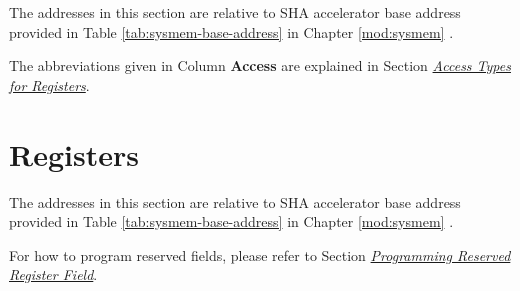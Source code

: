 \documentclass[main\_\_EN.tex]{subfiles}
\begin{document}
The addresses in this section are relative to SHA accelerator base address provided in Table \ref{tab:sysmem-base-address} in Chapter \ref{mod:sysmem} \textit{}.

The abbreviations given in Column \textbf{Access} are explained in Section \hyperref[glossary-access-types]{\textit{Access Types for Registers}}.






\newpage
\section{Registers}

The addresses in this section are relative to SHA accelerator base address provided in Table \ref{tab:sysmem-base-address} in Chapter \ref{mod:sysmem} \textit{}.

For how to program reserved fields, please refer to Section \hyperref[programming-reserved-field]{\textit{Programming Reserved Register Field}}.


\end{document}
